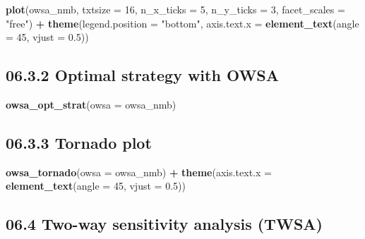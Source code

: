 \documentclass[
]{article}
\newenvironment{Shaded}{\begin{snugshade}}{\end{snugshade}}
\newcommand{\DataTypeTok}[1]{\textcolor[rgb]{0.13,0.29,0.53}{#1}}
\newcommand{\DecValTok}[1]{\textcolor[rgb]{0.00,0.00,0.81}{#1}}
\newcommand{\FloatTok}[1]{\textcolor[rgb]{0.00,0.00,0.81}{#1}}
\newcommand{\KeywordTok}[1]{\textcolor[rgb]{0.13,0.29,0.53}{\textbf{#1}}}
\newcommand{\NormalTok}[1]{#1}
\newcommand{\OperatorTok}[1]{\textcolor[rgb]{0.81,0.36,0.00}{\textbf{#1}}}
\newcommand{\StringTok}[1]{\textcolor[rgb]{0.31,0.60,0.02}{#1}}
\begin{document}
\begin{Shaded}
\begin{Highlighting}[]
\KeywordTok{plot}\NormalTok{(owsa_nmb, }\DataTypeTok{txtsize =} \DecValTok{16}\NormalTok{, }\DataTypeTok{n_x_ticks =} \DecValTok{5}\NormalTok{, }\DataTypeTok{n_y_ticks =} \DecValTok{3}\NormalTok{,}
     \DataTypeTok{facet_scales =} \StringTok{"free"}\NormalTok{) }\OperatorTok{+}
\StringTok{     }\KeywordTok{theme}\NormalTok{(}\DataTypeTok{legend.position =} \StringTok{"bottom"}\NormalTok{, }
           \DataTypeTok{axis.text.x =} \KeywordTok{element_text}\NormalTok{(}\DataTypeTok{angle =} \DecValTok{45}\NormalTok{, }\DataTypeTok{vjust =} \FloatTok{0.5}\NormalTok{))}
\end{Highlighting}
\end{Shaded}

\hypertarget{optimal-strategy-with-owsa}{%
\subsection{06.3.2 Optimal strategy with
OWSA}\label{optimal-strategy-with-owsa}}

\begin{Shaded}
\begin{Highlighting}[]
\KeywordTok{owsa_opt_strat}\NormalTok{(}\DataTypeTok{owsa =}\NormalTok{ owsa_nmb)}
\end{Highlighting}
\end{Shaded}

\hypertarget{tornado-plot}{%
\subsection{06.3.3 Tornado plot}\label{tornado-plot}}

\begin{Shaded}
\begin{Highlighting}[]
\KeywordTok{owsa_tornado}\NormalTok{(}\DataTypeTok{owsa =}\NormalTok{ owsa_nmb) }\OperatorTok{+}
\StringTok{  }\KeywordTok{theme}\NormalTok{(}\DataTypeTok{axis.text.x =} \KeywordTok{element_text}\NormalTok{(}\DataTypeTok{angle =} \DecValTok{45}\NormalTok{, }\DataTypeTok{vjust =} \FloatTok{0.5}\NormalTok{))}
\end{Highlighting}
\end{Shaded}

\hypertarget{two-way-sensitivity-analysis-twsa}{%
\subsection{06.4 Two-way sensitivity analysis
(TWSA)}\label{two-way-sensitivity-analysis-twsa}}
\end{document}
